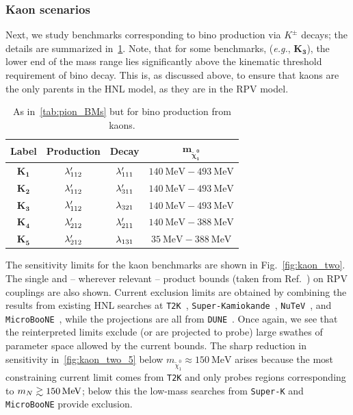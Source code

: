 \subsubsection{Kaon scenarios}
%
Next, we study benchmarks corresponding to bino production via $K^\pm$ decays; the 
details are summarized in~\cref{tab:kaon_BMs}. Note, that for some benchmarks, 
(\textit{e.g.}, $\bm{K_3}$), the lower end of the mass range lies significantly 
above the kinematic threshold requirement of bino decay. This is, as discussed 
above, to ensure that kaons are the only parents in the HNL model, as they are in 
the RPV model.

\begin{table}[h]
\centering
\begin{tabular}{|c|c|c|c|}
\hline
\bf{Label} & \bf{Production} & \bf{Decay} & $\bm{m_{\tilde{\chi}^0_1}}$\\
\hline
$\bm{K_1}$ & $\lambda'_{112}$ & $\lambda'_{111}$ & $\SI{140}{\MeV} - \SI{493}{\MeV}$\\
$\bm{K_2}$ & $\lambda'_{112}$ & $\lambda'_{311}$ & $\SI{140}{\MeV}-\SI{493}{\MeV}$\\
$\bm{K_3}$ & $\lambda'_{112}$ & $\lambda_{321}$ & $\SI{140}{\MeV} - \SI{493}{\MeV}$\\
$\bm{K_4}$ & $\lambda'_{212}$ & $\lambda'_{211}$ & $\SI{140}{\MeV}-\SI{388}{\MeV}$\\
$\bm{K_5}$ & $\lambda'_{212}$ & $\lambda_{131}$ & $\SI{35}{\MeV} - \SI{388}{\MeV}$\\
\hline
\end{tabular}
\caption{As in~\cref{tab:pion_BMs} but for bino production from kaons.}
\label{tab:kaon_BMs}
\end{table}

The sensitivity limits for the kaon benchmarks are shown in Fig.~\ref{fig:kaon_two}. The 
single and -- wherever relevant -- product bounds (taken from Ref.~\cite{Allanach:1999ic, 
Barbier:2004ez}) on RPV couplings are also shown. Current exclusion limits are obtained 
by combining the results from existing HNL searches at \texttt{T2K}~\cite{T2K:2019jwa}, 
\texttt{Super-Kamiokande}~\cite{Coloma:2019htx}, \texttt{NuTeV}~\cite{NuTeV:1999kej}, 
and \texttt{MicroBooNE}~\cite{Kelly:2021xbv, MicroBooNE:2022ctm}, while the projections 
are all from \texttt{DUNE}~\cite{Ballett:2019bgd}. Once again, we see that the 
reinterpreted limits exclude (or are projected to probe) large swathes of 
parameter space allowed by the current bounds. The sharp reduction in sensitivity 
in~\cref{fig:kaon_two_5} below $m_{\tilde{\chi}^0_1} \approx \SI{150}{\MeV}$ 
arises because the most constraining current limit comes from \texttt{T2K} and only probes regions corresponding to $m_N \gsim \SI{150}{\MeV}$; below this the low-mass searches from \texttt{Super-K} and \texttt{MicroBooNE} provide exclusion.

